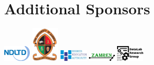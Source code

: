 \section{Additional Sponsors}

\begin{center}
\includegraphics[width=0.10\textwidth]{images/logos/Partnerlogos/img-etd2024-ndltd_logo.png}
\includegraphics[width=0.10\textwidth]{images/logos/Partnerlogos/img-etd2024-unza_logo.png}
\includegraphics[width=0.10\textwidth]{images/logos/Partnerlogos/img-etd2024-hea_logo.png}
\includegraphics[width=0.10\textwidth]{images/logos/Partnerlogos/img-etd2024-zamren_logo.png}
\includegraphics[width=0.10\textwidth]{images/logos/Partnerlogos/img-etd24-artwork-sponsors-datalab.png}
\end{center}

